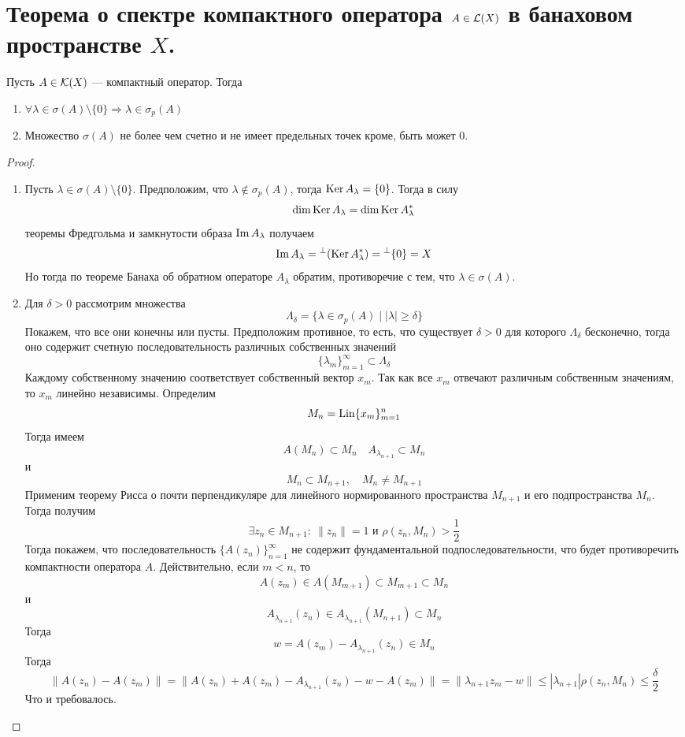 \newpage
\section{Теорема о спектре компактного оператора $A \in \mathcal{L}(X)$ в банаховом пространстве $X$.}
\begin{theorem}
	Пусть $A \in \mathcal{K}(X)$ --- компактный оператор. Тогда 
	\begin{enumerate}
		\item $\forall \lambda \in \sigma(A) \setminus \{0\} \Rightarrow \lambda \in \sigma_p(A)$
		\item Множество $\sigma(A)$ не более чем счетно и не имеет предельных точек кроме, быть может $0$.
	\end{enumerate}
\end{theorem}
\begin{proof}
	\begin{enumerate}
		\item Пусть $\lambda \in \sigma(A) \setminus \{0\}$. Предположим, что $\lambda \notin \sigma_p(A)$, тогда $\operatorname{Ker} A_\lambda = \{0\}$. Тогда в силу 
		$$
		\dim \operatorname{Ker} A_\lambda = \dim \operatorname{Ker} A^*_\lambda 
		$$
		теоремы Фредгольма и замкнутости образа $\operatorname{Im} A_\lambda$ получаем
		$$
		\operatorname{Im} A_\lambda = {}^\perp (\operatorname{Ker} A^*_\lambda) = {}^\perp\{0\} = X
		$$
		Но тогда по теореме Банаха об обратном операторе $A_\lambda$ обратим, противоречие с тем, что $\lambda \in \sigma(A)$. 
		\item Для $\delta > 0$ рассмотрим множества 
		$$
		\Lambda_\delta = \{ \lambda \in \sigma_p(A) \mid |\lambda| \geq \delta\}
		$$
		Покажем, что все они конечны или пусты. Предположим противное, то есть, что существует $\delta > 0$ для которого $\Lambda_\delta$ бесконечно, тогда оно содержит счетную последовательность различных собственных значений 
		$$
		\{\lambda_m\}_{m=1}^\infty \subset \Lambda_\delta
		$$
			Каждому собственному значению соответствует собственный вектор $x_m$. 
			Так как все $x_m$ отвечают различным собственным значениям, то $x_m$ линейно независимы. Определим 
		$$
		M_n = \operatorname{Lin} \{x_m\}_{m=1}^n
		$$
		Тогда имеем 
		$$
		A(M_n) \subset M_n \quad A_{\lambda_{n+1}} \subset M_n
		$$
		и
		$$
		M_n \subset M_{n+1}, \quad M_n \neq M_{n+1}
		$$
		Применим теорему Рисса о почти перпендикуляре для линейного нормированного пространства $M_{n+1}$ и его подпространства $M_n$. Тогда получим
		$$
		\exists z_n \in M_{n+1}: \ \|z_n\| = 1 \text{ и } \rho(z_n, M_n) > \frac{1}{2}
		$$
		Тогда покажем, что последовательность $\{A(z_n)\}_{n=1}^\infty$ не содержит фундаментальной подпоследовательности, что будет противоречить компактности оператора $A$. Действительно, если $m < n$, то 
		$$
		A(z_m) \in A(M_{m+1}) \subset M_{m+1} \subset M_n
		$$
		и
		$$
		A_{\lambda_{n+1}}(z_n) \in A_{\lambda_{n+1}}(M_{n+1}) \subset M_n
		$$
		Тогда 
		$$
		w = A(z_m) - A_{\lambda_{n+1}}(z_n) \in M_n
		$$
		Тогда 
		$$
		\|A(z_n) - A(z_m)\| = \|A(z_n) + A(z_m) - A_{\lambda_{n+1}}(z_n)  - w - A(z_m)\| = \|\lambda_{n+1} z_m - w\| \leq |\lambda_{n+1}|\rho(z_n, M_n) \leq \frac{\delta}{2}
		$$
		Что и требовалось. 
	\end{enumerate}
\end{proof}
